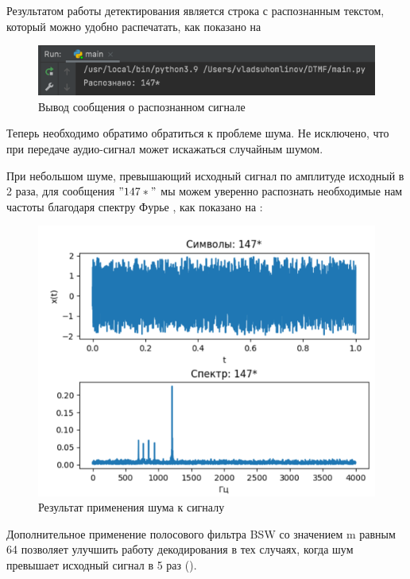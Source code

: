 Результатом работы детектирования является строка с распознанным текстом, который можно удобно распечатать, как показано на 

\begin{figure}[ht] 
	\center
	\includegraphics [scale=0.7] {my_folder/images/step-8}
	\caption{Вывод сообщения о распознанном сигнале} 
	\label{fig:step-8}
	\end{figure}

Теперь необходимо обратимо обратиться к проблеме шума. Не исключено, что при передаче аудио-сигнал может искажаться случайным шумом.

При небольшом шуме, превышающий исходный сигнал по амплитуде исходный в 2 раза, для сообщения $"147*"$ мы можем уверенно распознать необходимые нам частоты благодаря спектру Фурье \cite{book}, как показано на :

\begin{figure}[ht] 
	\center
	\includegraphics [scale=0.7] {my_folder/images/step-6}
	\caption{Результат применения шума к сигналу} 
	\label{fig:step-6}
	\end{figure}
	
Дополнительное применение полосового фильтра BSW \cite{bel} со значением m равным 64 позволяет улучшить работу декодирования в тех случаях, когда шум превышает исходный сигнал в 5 раз ().

